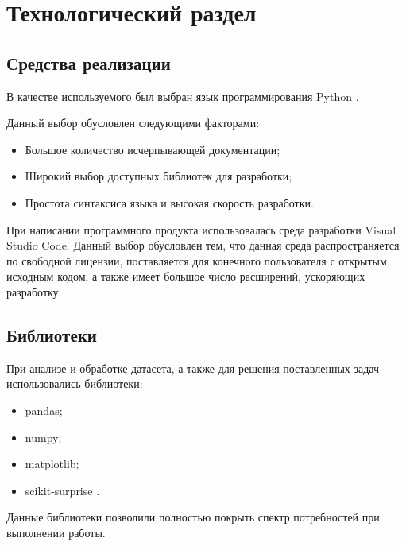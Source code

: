 \section{Технологический раздел}

\subsection{Средства реализации}

В качестве используемого был выбран язык программирования Python \cite{Python}.

Данный выбор обусловлен следующими факторами:
\begin{itemize}
	\item Большое количество исчерпывающей документации;
	\item Широкий выбор доступных библиотек для разработки;
	\item Простота синтаксиса языка и высокая скорость разработки.
\end{itemize} 

При написании программного продукта использовалась среда разработки Visual Studio Code. Данный выбор обусловлен тем, что данная среда распространяется по свободной лицензии, поставляется для конечного пользователя с открытым исходным кодом, а также имеет большое число расширений, ускоряющих разработку.

\subsection{Библиотеки}

При анализе и обработке датасета, а также для решения поставленных задач использовались библиотеки:
\begin{itemize}
	\item pandas;
	\item numpy;
	\item matplotlib;
	\item scikit-surprise \cite{surprise}.
\end{itemize}

Данные библиотеки позволили полностью покрыть спектр потребностей при выполнении работы.